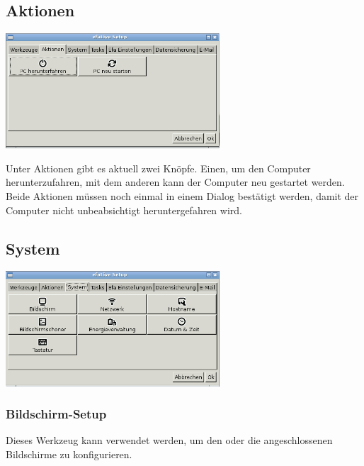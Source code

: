 \documentclass[a4paper,12pt,twoside]{article}
\begin{document}
\subsection{Aktionen}
\label{sct:aktionen}

\begin{minipage}{\linewidth}
    \centering
    \captionsetup{type=figure}
    \includegraphics[width=8cm]{screenshots/efalive_setup_actions.png}
    \label{fig:efalivesetup_actions}
\end{minipage}
\bigskip

Unter Aktionen gibt es aktuell zwei Knöpfe. Einen, um den Computer
herunterzufahren, mit dem anderen kann der Computer neu gestartet
werden. Beide Aktionen müssen noch einmal in einem Dialog bestätigt
werden, damit der Computer nicht unbeabsichtigt heruntergefahren wird.


\subsection{System}
\label{sct:efalivesetup_system}

\begin{minipage}{\linewidth}
    \centering
    \captionsetup{type=figure}
    \includegraphics[width=8cm]{screenshots/efalive_setup_system.png}
    \label{fig:efalivesetup_system}
\end{minipage}
\bigskip

\subsubsection{Bildschirm-Setup}
\label{sct:bildschirm}
Dieses Werkzeug kann verwendet werden, um den oder die angeschlossenen
Bildschirme zu konfigurieren.
\end{document}
